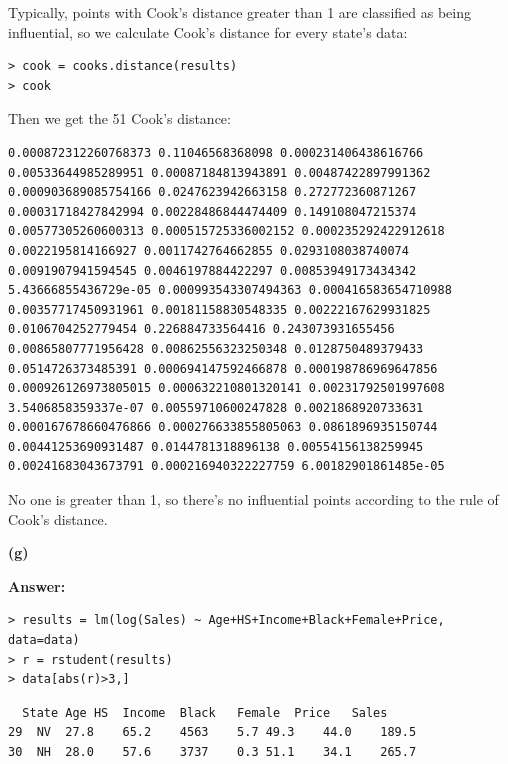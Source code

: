 \documentclass[letterpaper,11pt]{article}
\begin{document}
Typically, points with Cook's distance greater than 1 are classified as being influential, so we calculate Cook's distance for every state's data:
\begin{lstlisting}
> cook = cooks.distance(results)
> cook
\end{lstlisting}
Then we get the 51 Cook's distance:
\begin{lstlisting}
0.000872312260768373 0.11046568368098 0.000231406438616766 0.00533644985289951 0.00087184813943891 0.00487422897991362 0.000903689085754166 0.0247623942663158 0.272772360871267 0.00031718427842994 0.00228486844474409 0.149108047215374 0.00577305260600313 0.000515725336002152 0.000235292422912618 0.0022195814166927 0.0011742764662855 0.0293108038740074 0.0091907941594545 0.0046197884422297 0.00853949173434342 5.43666855436729e-05 0.000993543307494363 0.000416583654710988 0.00357717450931961 0.00181158830548335 0.00222167629931825 0.0106704252779454 0.226884733564416 0.243073931655456 0.00865807771956428 0.00862556323250348 0.0128750489379433 0.0514726373485391 0.000694147592466878 0.000198786969647856 0.000926126973805015 0.000632210801320141 0.00231792501997608 3.5406858359337e-07 0.00559710600247828 0.0021868920733631 0.000167678660476866 0.000276633855805063 0.0861896935150744 0.00441253690931487 0.0144781318896138 0.00554156138259945 0.00241683043673791 0.000216940322227759 6.00182901861485e-05
\end{lstlisting}
No one is greater than 1, so there's no influential points according to the rule of Cook's distance.

\begin{addmargin}[-1.1em]{0em}
  \textbf{(g)}\par
\end{addmargin}
\textbf{}\par
\bigbreak
\begin{addmargin}[-0.5em]{0em}
  \textbf{Answer: }
\end{addmargin}

\begin{lstlisting}
> results = lm(log(Sales) ~ Age+HS+Income+Black+Female+Price, data=data)
> r = rstudent(results)
> data[abs(r)>3,]
\end{lstlisting}

\begin{lstlisting}
  State	Age	HS	Income	Black	Female	Price	Sales
29	NV	27.8	65.2	4563	5.7	49.3	44.0	189.5
30	NH	28.0	57.6	3737	0.3	51.1	34.1	265.7
\end{lstlisting}
\end{document}
